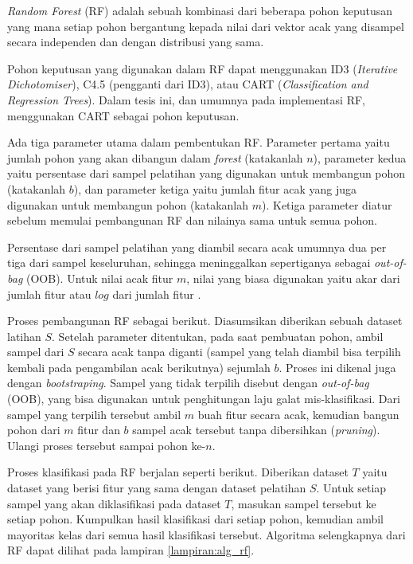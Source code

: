 \textit{Random Forest} (RF) \cite{breiman2001random}
adalah sebuah kombinasi dari beberapa pohon keputusan yang mana setiap pohon
bergantung kepada nilai dari vektor acak yang disampel secara independen dan
dengan distribusi yang sama.

Pohon keputusan yang digunakan dalam RF dapat menggunakan ID3
(\textit{Iterative Dichotomiser}), C4.5 (pengganti dari ID3), atau CART
(\textit{Classification and Regression Trees}).
Dalam tesis ini, dan umumnya pada implementasi RF, menggunakan CART sebagai
pohon keputusan.

Ada tiga parameter utama dalam pembentukan RF.
Parameter pertama yaitu jumlah pohon yang akan dibangun dalam \textit{forest}
(katakanlah $n$),
parameter kedua yaitu persentase dari sampel pelatihan yang digunakan untuk
membangun pohon (katakanlah $b$),
dan parameter ketiga yaitu jumlah fitur acak yang juga digunakan untuk
membangun pohon (katakanlah $m$).
Ketiga parameter diatur sebelum memulai pembangunan RF dan nilainya sama untuk
semua pohon.

Persentase dari sampel pelatihan yang diambil secara acak umumnya dua per tiga
dari sampel keseluruhan, sehingga meninggalkan sepertiganya sebagai
\textit{out-of-bag} (OOB).
Untuk nilai acak fitur $m$, nilai yang biasa digunakan yaitu akar dari jumlah
fitur atau $log$ dari jumlah fitur \cite{breiman2001random}.

Proses pembangunan RF sebagai berikut.
Diasumsikan diberikan sebuah dataset latihan $S$.
Setelah parameter ditentukan, pada saat pembuatan pohon, ambil sampel dari $S$
secara acak tanpa diganti (sampel yang telah diambil bisa terpilih kembali pada
pengambilan acak berikutnya) sejumlah $b$.
Proses ini dikenal juga dengan \textit{bootstraping}.
Sampel yang tidak terpilih disebut dengan \textit{out-of-bag} (OOB), yang
bisa digunakan untuk penghitungan laju galat mis-klasifikasi.
Dari sampel yang terpilih tersebut ambil $m$ buah fitur secara acak, kemudian
bangun pohon dari $m$ fitur dan $b$ sampel acak tersebut tanpa dibersihkan
(\textit{pruning}).
Ulangi proses tersebut sampai pohon ke-$n$.

Proses klasifikasi pada RF berjalan seperti berikut.
Diberikan dataset $T$ yaitu dataset yang berisi fitur yang sama dengan dataset
pelatihan $S$.
Untuk setiap sampel yang akan diklasifikasi pada dataset $T$, masukan sampel
tersebut ke setiap pohon.
Kumpulkan hasil klasifikasi dari setiap pohon, kemudian ambil mayoritas kelas
dari semua hasil klasifikasi tersebut.
Algoritma selengkapnya dari RF dapat dilihat pada lampiran
\ref{lampiran:alg_rf}.


